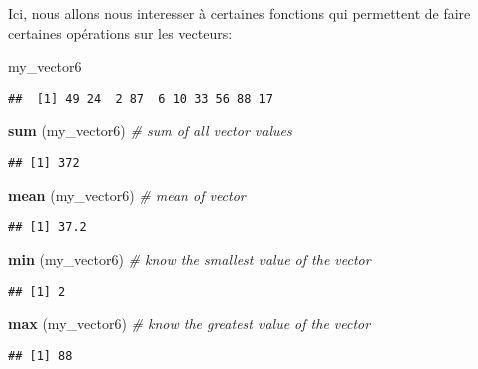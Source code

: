 \documentclass[
]{article}
\newenvironment{Shaded}{\begin{snugshade}}{\end{snugshade}}
\newcommand{\CommentTok}[1]{\textcolor[rgb]{0.56,0.35,0.01}{\textit{#1}}}
\newcommand{\FunctionTok}[1]{\textcolor[rgb]{0.13,0.29,0.53}{\textbf{#1}}}
\newcommand{\NormalTok}[1]{#1}
\begin{document}
Ici, nous allons nous interesser à certaines fonctions qui permettent de
faire certaines opérations sur les vecteurs:

\begin{Shaded}
\begin{Highlighting}[]
\NormalTok{my\_vector6}
\end{Highlighting}
\end{Shaded}

\begin{verbatim}
##  [1] 49 24  2 87  6 10 33 56 88 17
\end{verbatim}

\begin{Shaded}
\begin{Highlighting}[]
\FunctionTok{sum}\NormalTok{ (my\_vector6) }\CommentTok{\# sum of all vector values}
\end{Highlighting}
\end{Shaded}

\begin{verbatim}
## [1] 372
\end{verbatim}

\begin{Shaded}
\begin{Highlighting}[]
\FunctionTok{mean}\NormalTok{ (my\_vector6) }\CommentTok{\# mean of vector}
\end{Highlighting}
\end{Shaded}

\begin{verbatim}
## [1] 37.2
\end{verbatim}

\begin{Shaded}
\begin{Highlighting}[]
\FunctionTok{min}\NormalTok{ (my\_vector6) }\CommentTok{\# know the smallest value of the vector}
\end{Highlighting}
\end{Shaded}

\begin{verbatim}
## [1] 2
\end{verbatim}

\begin{Shaded}
\begin{Highlighting}[]
\FunctionTok{max}\NormalTok{ (my\_vector6) }\CommentTok{\# know the greatest value of the vector}
\end{Highlighting}
\end{Shaded}

\begin{verbatim}
## [1] 88
\end{verbatim}
\end{document}
